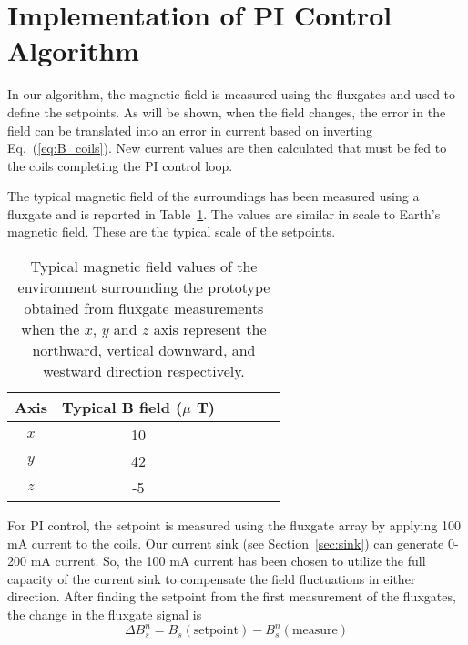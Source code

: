 \section{Implementation of PI Control Algorithm}\label{sec:pi}
 In our algorithm, the magnetic field is measured using the fluxgates and used to define the setpoints. As will be shown, when the field changes, the error in the field can be translated into an error in current based on inverting Eq.~(\ref{eq:B_coils}). New current values are then calculated that must be fed to the coils completing the PI control loop. 


The typical magnetic field of the surroundings has been measured using a fluxgate and is reported in Table~\ref{table:Benvironment}. The values are similar in scale to Earth's magnetic field. These are the typical scale of the setpoints.

\begin{table} 
    \centering
    \begin{tabular} { |c|c|c|c|c|c|} 
        \hline
        Axis & \makecell{Typical B field \\($\mu$ T)}\\
        \hline\hline
        $x$ & 10 \\ 
        \hline
        $y$ & 42 \\ 
        \hline
        $z$ & -5 \\ 
        \hline
    \end{tabular}
    \caption[Typical magnetic fields surrounding the prototype]{Typical magnetic field values of the environment surrounding the prototype obtained from fluxgate measurements when the $x$, $y$ and $z$ axis represent the northward, vertical downward, and westward direction respectively. }\label{table:Benvironment}
\end{table}

For PI control, the setpoint is measured using the fluxgate array by applying 100 mA current to the coils. Our current sink (see Section~\ref{sec:sink}) can generate 0-200 mA current. So, the 100 mA current has been chosen to utilize the full capacity of the current sink to compensate the field fluctuations in either direction. After finding the setpoint from the first measurement of the fluxgates, the change in the fluxgate signal is
\begin{equation}\label{eq:del_B}
    \Delta B_s^n = B_s(\mathrm{setpoint}) - B_s^n(\mathrm{measure})
\end{equation}

